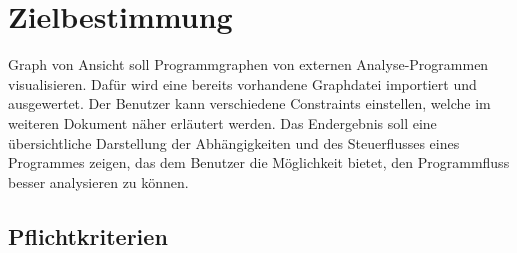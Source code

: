 \chapter{Zielbestimmung}

Graph von Ansicht soll Programmgraphen von externen Analyse-Programmen visualisieren. Dafür wird eine bereits vorhandene Graphdatei importiert und ausgewertet. Der Benutzer kann verschiedene Constraints einstellen, welche im weiteren Dokument näher erläutert werden.
Das Endergebnis soll eine übersichtliche Darstellung der Abhängigkeiten und des Steuerflusses eines Programmes zeigen, das dem Benutzer die Möglichkeit bietet, den Programmfluss besser analysieren zu können.

\section{Pflichtkriterien}

